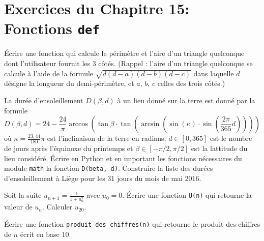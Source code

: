 \section*{Exercices du Chapitre 15: Fonctions \texttt{def}}

\begin{question}
Écrire une fonction qui calcule le périmètre et l'aire d’un triangle quelconque
dont l'utilisateur fournit les 3 côtés.
(Rappel : l'aire d’un triangle quelconque se calcule à l'aide de la formule
$\sqrt{d(d-a)(d-b)(d-c)}$ dans laquelle $d$ désigne la longueur du
demi-périmètre, et $a$, $b$, $c$ celles des trois côtés.)
\end{question}

\begin{exercice}
La durée d'ensoleillement $D(\beta, d)$ à un lieu donné sur la terre est donné par
la formule
\[
D(\beta,d) = 24 - \frac{24}{\pi}\arccos\left( \tan \beta \cdot
\tan\left(\arcsin\left(\sin(\kappa)\cdot \sin\left(\frac{2\pi}{365}d
\right)\right)\right)\right)
\]
où $\kappa=\frac{23,44}{180}\pi$ est l'inclinaison de la terre en radians,
$d\in[0,365]$ est le nombre de jours après l'équinoxe du printemps et
$\beta\in[-\pi/2,\pi/2]$ est la lattitude du lieu considéré.
Écrire en Python et en important les fonctions nécessaires du module
\texttt{math} la fonction \texttt{D(beta, d)}. Construire la liste des durées
d'ensoleillement à Liège pour les 31 jours du mois de mai 2016.
\end{exercice}

\begin{question}
Soit la suite $u_{n+1}= \frac{1}{1+u_n^2}$ avec $u_0=0$.
Écrire une fonction \texttt{U(n)} qui retourne la valeur de $u_n$. Calculer $u_{20}$.
\end{question}

\begin{question}
Écrire une fonction \texttt{produit\_des\_chiffres(n)} qui retourne le produit
des chiffres de $n$ écrit en base 10. 
\end{question}

